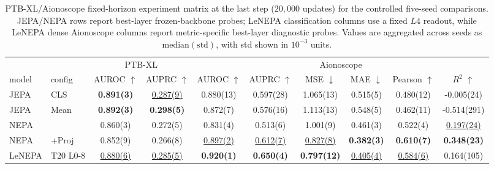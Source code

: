 \begin{table}[t]
\centering
\small
\caption{PTB-XL/Aionoscope fixed-horizon experiment matrix at the last step ($20{,}000$ updates) for the controlled five-seed comparisons. JEPA/NEPA rows report best-layer frozen-backbone probes; LeNEPA classification columns use a fixed $L4$ readout, while LeNEPA dense Aionoscope columns report metric-specific best-layer diagnostic probes. Values are aggregated across seeds as $\mathrm{median}(\mathrm{std})$, with std shown in $10^{-3}$ units.}
\label{tab:summary_selected_best_last_step}
\begin{tabular*}{\textwidth}{@{\extracolsep{\fill}}llcccccccc@{}}
\toprule
\multicolumn{2}{c}{} & \multicolumn{2}{c}{PTB-XL} & \multicolumn{6}{c}{Aionoscope} \\
\cmidrule(lr){3-4} \cmidrule(lr){5-10}
model & config & \multicolumn{1}{c}{AUROC $\uparrow$} & \multicolumn{1}{c}{AUPRC $\uparrow$} & \multicolumn{1}{c}{AUROC $\uparrow$} & \multicolumn{1}{c}{AUPRC $\uparrow$} & \multicolumn{1}{c}{MSE $\downarrow$} & \multicolumn{1}{c}{MAE $\downarrow$} & \multicolumn{1}{c}{Pearson $\uparrow$} & \multicolumn{1}{c}{$R^2$ $\uparrow$} \\
\midrule
JEPA & CLS & \textbf{0.891(3)} & \underline{0.287(9)} & 0.880(13) & 0.597(28) & 1.065(13) & 0.515(5) & 0.480(12) & -0.005(24) \\
JEPA & Mean & \textbf{0.892(3)} & \textbf{0.298(5)} & 0.872(7) & 0.576(16) & 1.113(13) & 0.548(5) & 0.462(11) & -0.514(291) \\
NEPA &  & 0.860(3) & 0.272(5) & 0.831(4) & 0.513(6) & 1.001(9) & 0.461(3) & 0.522(4) & \underline{0.197(24)} \\
NEPA & +Proj & 0.852(9) & 0.266(8) & \underline{0.897(2)} & \underline{0.612(7)} & \underline{0.827(8)} & \textbf{0.382(3)} & \textbf{0.610(7)} & \textbf{0.348(23)} \\
LeNEPA & T20 L0-8 & \underline{0.880(6)} & \underline{0.285(5)} & \textbf{0.920(1)} & \textbf{0.650(4)} & \textbf{0.797(12)} & \underline{0.405(4)} & \underline{0.584(6)} & 0.164(105) \\
\bottomrule
\end{tabular*}
\end{table}
